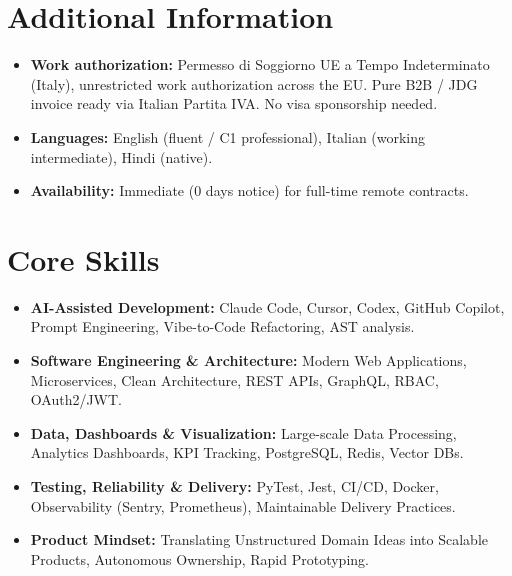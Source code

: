 \documentclass[a4paper,10pt]{article}
\begin{document}
\section{Additional Information}
\begin{itemize}
  \item \textbf{Work authorization:} Permesso di Soggiorno UE a Tempo Indeterminato (Italy), unrestricted work authorization across the EU. Pure B2B / JDG invoice ready via Italian Partita IVA. No visa sponsorship needed.
  \item \textbf{Languages:} English (fluent / C1 professional), Italian (working intermediate), Hindi (native).
  \item \textbf{Availability:} Immediate (0 days notice) for full-time remote contracts.
\end{itemize}

\section{Core Skills}
\begin{itemize}
  \item \textbf{AI-Assisted Development:} Claude Code, Cursor, Codex, GitHub Copilot, Prompt Engineering, Vibe-to-Code Refactoring, AST analysis.
  \item \textbf{Software Engineering \& Architecture:} Modern Web Applications, Microservices, Clean Architecture, REST APIs, GraphQL, RBAC, OAuth2/JWT.
  \item \textbf{Data, Dashboards \& Visualization:} Large-scale Data Processing, Analytics Dashboards, KPI Tracking, PostgreSQL, Redis, Vector DBs.
  \item \textbf{Testing, Reliability \& Delivery:} PyTest, Jest, CI/CD, Docker, Observability (Sentry, Prometheus), Maintainable Delivery Practices.
  \item \textbf{Product Mindset:} Translating Unstructured Domain Ideas into Scalable Products, Autonomous Ownership, Rapid Prototyping.
\end{itemize}
\end{document}
